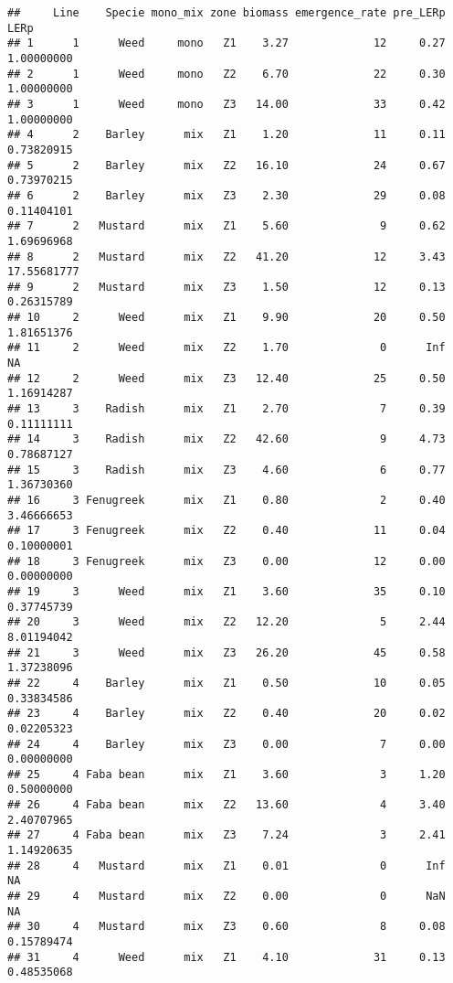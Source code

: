 \documentclass[
]{article}
\begin{document}
\begin{verbatim}
##     Line    Specie mono_mix zone biomass emergence_rate pre_LERp        LERp
## 1      1      Weed     mono   Z1    3.27             12     0.27  1.00000000
## 2      1      Weed     mono   Z2    6.70             22     0.30  1.00000000
## 3      1      Weed     mono   Z3   14.00             33     0.42  1.00000000
## 4      2    Barley      mix   Z1    1.20             11     0.11  0.73820915
## 5      2    Barley      mix   Z2   16.10             24     0.67  0.73970215
## 6      2    Barley      mix   Z3    2.30             29     0.08  0.11404101
## 7      2   Mustard      mix   Z1    5.60              9     0.62  1.69696968
## 8      2   Mustard      mix   Z2   41.20             12     3.43 17.55681777
## 9      2   Mustard      mix   Z3    1.50             12     0.13  0.26315789
## 10     2      Weed      mix   Z1    9.90             20     0.50  1.81651376
## 11     2      Weed      mix   Z2    1.70              0      Inf          NA
## 12     2      Weed      mix   Z3   12.40             25     0.50  1.16914287
## 13     3    Radish      mix   Z1    2.70              7     0.39  0.11111111
## 14     3    Radish      mix   Z2   42.60              9     4.73  0.78687127
## 15     3    Radish      mix   Z3    4.60              6     0.77  1.36730360
## 16     3 Fenugreek      mix   Z1    0.80              2     0.40  3.46666653
## 17     3 Fenugreek      mix   Z2    0.40             11     0.04  0.10000001
## 18     3 Fenugreek      mix   Z3    0.00             12     0.00  0.00000000
## 19     3      Weed      mix   Z1    3.60             35     0.10  0.37745739
## 20     3      Weed      mix   Z2   12.20              5     2.44  8.01194042
## 21     3      Weed      mix   Z3   26.20             45     0.58  1.37238096
## 22     4    Barley      mix   Z1    0.50             10     0.05  0.33834586
## 23     4    Barley      mix   Z2    0.40             20     0.02  0.02205323
## 24     4    Barley      mix   Z3    0.00              7     0.00  0.00000000
## 25     4 Faba bean      mix   Z1    3.60              3     1.20  0.50000000
## 26     4 Faba bean      mix   Z2   13.60              4     3.40  2.40707965
## 27     4 Faba bean      mix   Z3    7.24              3     2.41  1.14920635
## 28     4   Mustard      mix   Z1    0.01              0      Inf          NA
## 29     4   Mustard      mix   Z2    0.00              0      NaN          NA
## 30     4   Mustard      mix   Z3    0.60              8     0.08  0.15789474
## 31     4      Weed      mix   Z1    4.10             31     0.13  0.48535068

\end{verbatim}
\end{document}
